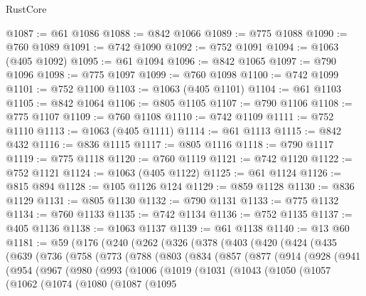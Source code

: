 \begin{lexlean}{RustCore}
\begin{coremodule}
@1087 := @61 @1086
@1088 := @842 @1066
@1089 := @775 @1088
@1090 := @760 @1089
@1091 := @742 @1090
@1092 := @752 @1091
@1094 := @1063 (@405 @1092)
@1095 := @61 @1094
@1096 := @842 @1065
@1097 := @790 @1096
@1098 := @775 @1097
@1099 := @760 @1098
@1100 := @742 @1099
@1101 := @752 @1100
@1103 := @1063 (@405 @1101)
@1104 := @61 @1103
@1105 := @842 @1064
@1106 := @805 @1105
@1107 := @790 @1106
@1108 := @775 @1107
@1109 := @760 @1108
@1110 := @742 @1109
@1111 := @752 @1110
@1113 := @1063 (@405 @1111)
@1114 := @61 @1113
@1115 := @842 @432
@1116 := @836 @1115
@1117 := @805 @1116
@1118 := @790 @1117
@1119 := @775 @1118
@1120 := @760 @1119
@1121 := @742 @1120
@1122 := @752 @1121
@1124 := @1063 (@405 @1122)
@1125 := @61 @1124
@1126 := @815 @894
@1128 := @105 @1126 @124
@1129 := @859 @1128
@1130 := @836 @1129
@1131 := @805 @1130
@1132 := @790 @1131
@1133 := @775 @1132
@1134 := @760 @1133
@1135 := @742 @1134
@1136 := @752 @1135
@1137 := @405 @1136
@1138 := @1063 @1137
@1139 := @61 @1138
@1140 := @13 @60
@1181 := @59
    (@176
      (@240
        (@262
          (@326
            (@378
              (@403
                (@420
                  (@424
                    (@435
                      (@639
                        (@736
                          (@758
                            (@773
                              (@788
                                (@803
                                  (@834
                                    (@857
                                      (@877
                                        (@914
                                          (@928
                                            (@941
                                              (@954
                                                (@967
                                                  (@980
                                                    (@993
                                                      (@1006
                                                        (@1019
                                                          (@1031
                                                            (@1043
                                                              (@1050
                                                                (@1057
                                                                  (@1062
                                                                    (@1074
                                                                      (@1080
                                                                        (@1087
                                                                          (@1095

\end{coremodule}
\end{lexlean}
